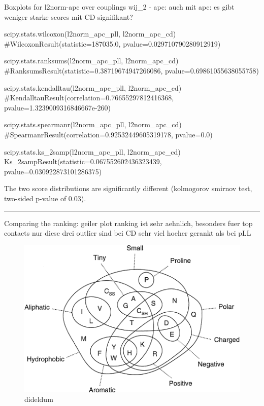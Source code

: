 \documentclass[11pt,a4paper,twoside]{book}
\theoremstyle{definition}
\theoremstyle{definition}
\theoremstyle{remark}
\begin{document}
Boxplots for l2norm-apc over couplings
\textbar{}\textbar{}wij\textbar{}\textbar{}\_2 - apc: auch mit apc: es
gibt weniger starke scores mit CD signifikant?

scipy.stats.wilcoxon(l2norm\_apc\_pll, l2norm\_apc\_cd)
\#WilcoxonResult(statistic=187035.0, pvalue=0.029710790280912919)

scipy.stats.ranksums(l2norm\_apc\_pll, l2norm\_apc\_cd)
\#RanksumsResult(statistic=0.38719674947266086,
pvalue=0.69861055638055758)

scipy.stats.kendalltau(l2norm\_apc\_pll, l2norm\_apc\_cd)
\#KendalltauResult(correlation=0.76655297812416368,
pvalue=1.3239009316846667e-260)

scipy.stats.spearmanr(l2norm\_apc\_pll, l2norm\_apc\_cd)
\#SpearmanrResult(correlation=0.92532449605319178, pvalue=0.0)

scipy.stats.ks\_2samp(l2norm\_apc\_pll, l2norm\_apc\_cd)
Ks\_2sampResult(statistic=0.067552602436323439,
pvalue=0.030922873101286375)

The two score distributions are significantly different (kolmogorov
smirnov test, two-sided p-value of 0.03).

\begin{center}\rule{0.5\linewidth}{\linethickness}\end{center}

Comparing the ranking: geiler plot ranking ist sehr aehnlich, besonders
fuer top contacts nur diese drei outlier sind bei CD sehr viel hoeher
gerankt als bei pLL

\begin{figure}

{\centering \includegraphics[width=1\linewidth]{img/aa_venn_diagram} 

}

\caption{dideldum}\label{fig:comparing-cd-pll-ranking}
\end{figure}
\end{document}
